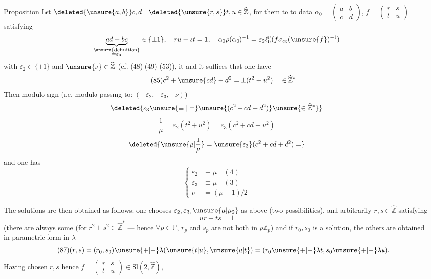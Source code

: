 \uline{Proposition} Let $\deleted{\unsure{a,b}}c,d\quad\deleted{\unsure{r,s}}t,u\in\widehat{\mathbb Z}$,
for them to  to data
$\alpha_0=\begin{pmatrix}a&b\\c&d\end{pmatrix}$,
$f=\begin{pmatrix}r&s\\t&u\end{pmatrix}$ satisfying
\[
\underbrace{ad-bc}_{\substack{\unsure{\text{definition}}\\=\varepsilon_3}}\in\{\pm1\},
\quad ru-st=1,
\quad\alpha_0\rho(\alpha_0)^{-1}=\varepsilon_2\ell_0^{\nu}(f\sigma_\infty(\unsure{f})^{-1})
\]
with $\varepsilon_2\in\{\pm1\}$ and $\unsure{\nu}\in\widehat{\mathbb Z}$
 (cf. (48) (49) (53)),
it  and  it suffices that one have
\[
\tag{85}
c^2+\unsure{cd}+d^2=\pm(t^2+u^2)\quad\in\widehat{\mathbb Z}^*
\]
Then 
modulo sign (i.e. modulo passing to: $(-\varepsilon_2,-\varepsilon_3,-\nu)$)
\[
\deleted{\varepsilon_3\unsure{\equiv|=}\unsure{(c^2+cd+d^2)}\unsure{\in\widehat{\mathbb Z}^*}}
\]
\[
\tag{86}
\frac1\mu=\varepsilon_2(t^2+u^2)=\varepsilon_3(c^2+cd+u^2)
\]
\[
\deleted{\unsure{\mu|\frac1\mu}=\unsure{\varepsilon_3}(c^2+cd+d^2)=}
\]
and one has
\[
\tag{87}
\left\{\begin{aligned}
\varepsilon_2&\equiv\mu\quad(4)\\
\varepsilon_3&\equiv\mu\quad(3)\\
\nu&=(\mu-1)/2
\end{aligned}\right.
\]



The solutions are then obtained as follows: one chooses
$\varepsilon_2,\varepsilon_3,\unsure{\mu|\mu_2}$ as above (two possibilities),  and arbitrarily $r,s\in\widehat{\mathbb Z}$ satisfying
\[
ur-ts=1
\]
(there are always some (for $r^2+s^2\in\widehat{\mathbb Z}^*$ --- hence
$\forall p\in\mathbb P$, $r_p$ and $s_p$ are not both in $p\mathbb Z_p$)
and if $r_0,s_0$ is a solution, the others are obtained in parametric form in $\lambda$
\[
\tag{87}
(r,s)=(r_0,s_0)\unsure{+|-}\lambda(\unsure{t|u},\unsure{u|t})
=(r_0\unsure{+|-}\lambda t,s_0\unsure{+|-}\lambda u).
\]
Having chosen $r,s$ hence $f=\begin{pmatrix}r&s\\t&u\end{pmatrix}\in\mathrm{Sl}(2,\widehat{\mathbb Z})$,

